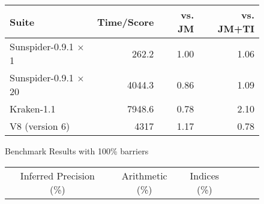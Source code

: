 \begin{figure}
\centering
\begin{tabular}{lrrr}
\toprule
Suite & Time/Score & vs. JM & vs. JM+TI \\
\midrule
Sunspider-0.9.1 $\times$1  & 262.2  & 1.00 & 1.06 \\
Sunspider-0.9.1 $\times$20 & 4044.3 & 0.86  & 1.09 \\
Kraken-1.1          & 7948.6 & 0.78  & 2.10 \\
V8 (version 6)      & 4317   & 1.17 & 0.78 \\
\bottomrule
\end{tabular}
\nocaptionrule \caption{Benchmark Results with 100\% barriers}
\label{fig:benchmarks100}
\end{figure}

\begin{figure*}
\centering
\begin{tabular}{lrrrrrrrrrrrrrrr}
\toprule
& \multicolumn{3}{c}{Inferred Precision (\%)} &
& \multicolumn{4}{c}{Arithmetic (\%)}
& \multicolumn{4}{c}{Indices (\%)} \\

\cmidrule(r){2-4}
\cmidrule(r){6-9}
\cmidrule{10-13}


\end{tabular}
\end{figure*}
